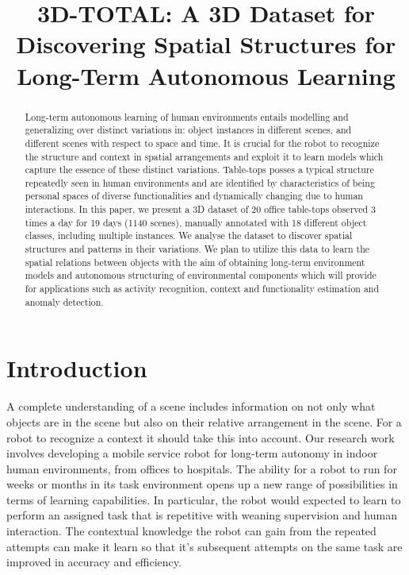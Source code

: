 \documentclass[letterpaper, 10 pt, conference]{ieeeconf}
\title{\LARGE \bf
3D-TOTAL: A 3D Dataset for Discovering Spatial Structures for Long-Term Autonomous
 Learning
}
\begin{document}
\maketitle
\thispagestyle{empty}
\pagestyle{empty}

\begin{abstract}

Long-term autonomous learning of human environments entails modelling 
and generalizing over distinct variations in: object instances in different scenes, 
and different scenes with respect to space and time. It is crucial for the 
robot to recognize the structure and context in spatial arrangements and 
exploit it to learn models which capture the essence of these distinct variations.
Table-tops posses a typical structure repeatedly seen in human environments
and are identified by characteristics of being personal spaces of diverse
functionalities and dynamically changing due to human interactions. In this
paper, we present a 3D dataset of 20 office table-tops observed 3 times a 
day for 19 days (1140 scenes), manually annotated with 18 different object 
classes, including multiple instances. We analyse the dataset to discover 
spatial structures and patterns in their variations. We plan to utilize 
this data to learn the spatial relations between objects with the 
aim of obtaining long-term environment models and autonomous structuring 
of environmental components which will provide for applications such 
as activity recognition, context and functionality estimation and anomaly detection.

\end{abstract}


\section{Introduction}
\label{sec:Introduction}

A complete understanding of a scene includes information on not only 
what objects are in the scene but also on their relative arrangement in
the scene. For a robot to recognize a context it should take this into
account.  Our research work involves developing
a mobile service robot for long-term autonomy in indoor human
environments, from offices to hospitals.  The ability for a robot to
run for weeks or months in its task environment opens up a new range
of possibilities in terms of learning capabilities. In particular, the
robot would expected to learn to perform an assigned task that is
repetitive with weaning supervision and human interaction. The
contextual knowledge the robot can gain from the repeated attempts can
make it learn so that it's subsequent attempts on the same task are
improved in accuracy and efficiency.
\end{document}
